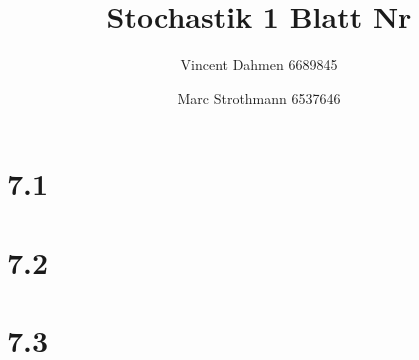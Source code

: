 \documentclass[12pt,a4paper]{article}
\title{Stochastik 1 Blatt Nr \Nr}
\author{Vincent Dahmen 6689845 \and Marc Strothmann 6537646}
\gdef\Nr{7}
\begin{document}
\maketitle{}


\section*{\Nr.1}


\section*{\Nr.2}


\section*{\Nr.3}

\end{document}
